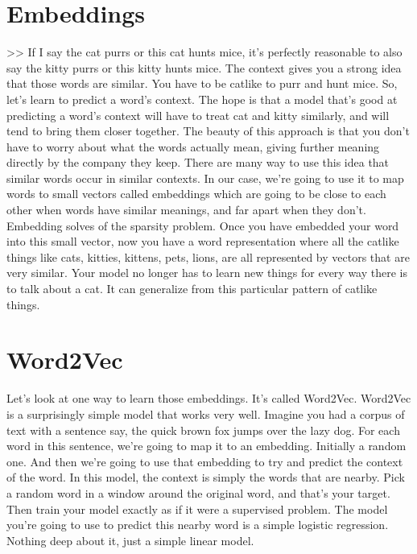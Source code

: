 \documentclass{article}
\begin{document}
\section{Embeddings}
>> If I say the cat purrs or
this cat hunts mice, it's
perfectly reasonable to also say the
kitty purrs or this kitty hunts mice.
The context gives you a strong
idea that those words are similar.
You have to be catlike to purr and
hunt mice.
So, let's learn to
predict a word's context.
The hope is that a model that's good at
predicting a word's context will have to
treat cat and kitty similarly, and
will tend to bring them closer together.
The beauty of this approach is that you
don't have to worry about what the words
actually mean, giving further meaning
directly by the company they keep.
There are many way to use this idea that
similar words occur in similar contexts.
In our case, we're going to use
it to map words to small vectors
called embeddings which are going
to be close to each other
when words have similar meanings,
and far apart when they don't.
Embedding solves of
the sparsity problem.
Once you have embedded your word into
this small vector, now you have a word
representation where all the catlike
things like cats, kitties, kittens,
pets, lions, are all represented
by vectors that are very similar.
Your model no longer has
to learn new things for
every way there is to talk about a cat.
It can generalize from this
particular pattern of catlike things.
\section{Word2Vec}
Let's look at one way to
learn those embeddings.
It's called Word2Vec.
Word2Vec is a surprisingly simple
model that works very well.
Imagine you had a corpus of
text with a sentence say,
the quick brown fox
jumps over the lazy dog.
For each word in this sentence,
we're going to map it to an embedding.
Initially a random one.
And then we're going to use
that embedding to try and
predict the context of the word.
In this model, the context is
simply the words that are nearby.
Pick a random word in a window
around the original word,
and that's your target.
Then train your model exactly as
if it were a supervised problem.
The model you're going to use
to predict this nearby word
is a simple logistic regression.
Nothing deep about it,
just a simple linear model.
\end{document}

